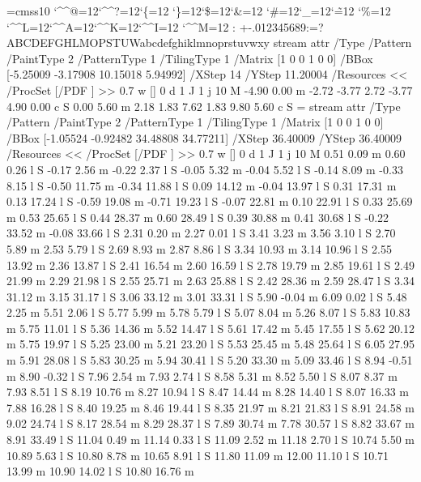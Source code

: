 \font\THFa=cmss10
\begingroup
\catcode`\^^@=12\catcode`\^^?=12\catcode`\{=12
\catcode`\}=12\catcode`\$=12\catcode`\&=12
\catcode`\#=12\catcode`\_=12\catcode`\~=12
\catcode`\%=12
\catcode`\^^L=12\catcode`\^^A=12\catcode`\^^K=12\catcode`\^^I=12
\catcode`\^^M=12
\THFa:^^M+-.012345689:=?ABCDEFGHLMOPSTUWabcdefghiklmnoprstuvwxy\endinclude\endgroup
\immediate\pdfobj stream attr {/Type /Pattern
/PaintType 2 /PatternType 1 /TilingType 1
/Matrix [1 0 0 1 0 0]
/BBox [-5.25009 -3.17908 10.15018 5.94992]
/XStep 14
/YStep 11.20004
/Resources << /ProcSet [/PDF ] >> } {
0.7 w
[] 0 d
1 J
1 j
10 M
-4.90 0.00 m
-2.72 -3.77 2.72 -3.77 4.90 0.00 c
S
0.00 5.60 m
2.18 1.83 7.62 1.83 9.80 5.60 c
S
} \newcount \THPa\THPa=\pdflastobj
\immediate\pdfobj stream attr {/Type /Pattern
/PaintType 2 /PatternType 1 /TilingType 1
/Matrix [1 0 0 1 0 0]
/BBox [-1.05524 -0.92482 34.48808 34.77211]
/XStep 36.40009
/YStep 36.40009
/Resources << /ProcSet [/PDF ] >> } {
0.7 w
[] 0 d
1 J
1 j
10 M
0.51 0.09 m
0.60 0.26 l
S
-0.17 2.56 m
-0.22 2.37 l
S
-0.05 5.32 m
-0.04 5.52 l
S
-0.14 8.09 m
-0.33 8.15 l
S
-0.50 11.75 m
-0.34 11.88 l
S
0.09 14.12 m
-0.04 13.97 l
S
0.31 17.31 m
0.13 17.24 l
S
-0.59 19.08 m
-0.71 19.23 l
S
-0.07 22.81 m
0.10 22.91 l
S
0.33 25.69 m
0.53 25.65 l
S
0.44 28.37 m
0.60 28.49 l
S
0.39 30.88 m
0.41 30.68 l
S
-0.22 33.52 m
-0.08 33.66 l
S
2.31 0.20 m
2.27 0.01 l
S
3.41 3.23 m
3.56 3.10 l
S
2.70 5.89 m
2.53 5.79 l
S
2.69 8.93 m
2.87 8.86 l
S
3.34 10.93 m
3.14 10.96 l
S
2.55 13.92 m
2.36 13.87 l
S
2.41 16.54 m
2.60 16.59 l
S
2.78 19.79 m
2.85 19.61 l
S
2.49 21.99 m
2.29 21.98 l
S
2.55 25.71 m
2.63 25.88 l
S
2.42 28.36 m
2.59 28.47 l
S
3.34 31.12 m
3.15 31.17 l
S
3.06 33.12 m
3.01 33.31 l
S
5.90 -0.04 m
6.09 0.02 l
S
5.48 2.25 m
5.51 2.06 l
S
5.77 5.99 m
5.78 5.79 l
S
5.07 8.04 m
5.26 8.07 l
S
5.83 10.83 m
5.75 11.01 l
S
5.36 14.36 m
5.52 14.47 l
S
5.61 17.42 m
5.45 17.55 l
S
5.62 20.12 m
5.75 19.97 l
S
5.25 23.00 m
5.21 23.20 l
S
5.53 25.45 m
5.48 25.64 l
S
6.05 27.95 m
5.91 28.08 l
S
5.83 30.25 m
5.94 30.41 l
S
5.20 33.30 m
5.09 33.46 l
S
8.94 -0.51 m
8.90 -0.32 l
S
7.96 2.54 m
7.93 2.74 l
S
8.58 5.31 m
8.52 5.50 l
S
8.07 8.37 m
7.93 8.51 l
S
8.19 10.76 m
8.27 10.94 l
S
8.47 14.44 m
8.28 14.40 l
S
8.07 16.33 m
7.88 16.28 l
S
8.40 19.25 m
8.46 19.44 l
S
8.35 21.97 m
8.21 21.83 l
S
8.91 24.58 m
9.02 24.74 l
S
8.17 28.54 m
8.29 28.37 l
S
7.89 30.74 m
7.78 30.57 l
S
8.82 33.67 m
8.91 33.49 l
S
11.04 0.49 m
11.14 0.33 l
S
11.09 2.52 m
11.18 2.70 l
S
10.74 5.50 m
10.89 5.63 l
S
10.80 8.78 m
10.65 8.91 l
S
11.80 11.09 m
12.00 11.10 l
S
10.71 13.99 m
10.90 14.02 l
S
10.80 16.76 m
}
